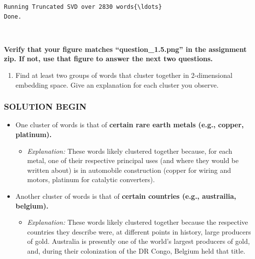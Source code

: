 \documentclass[11pt]{article}
\providecommand{\tightlist}{%
      \setlength{\itemsep}{0pt}\setlength{\parskip}{0pt}}
\begin{document}
    \begin{Verbatim}[commandchars=\\\{\}]
Running Truncated SVD over 2830 words{\ldots}
Done.
    \end{Verbatim}

    \begin{center}
    \end{center}
    { \hspace*{\fill} \\}
    
    \textbf{Verify that your figure matches ``question\_1.5.png'' in the
assignment zip. If not, use that figure to answer the next two
questions.}

    \begin{enumerate}
\def\labelenumi{\alph{enumi}.}
\tightlist
\item
  Find at least two groups of words that cluster together in
  2-dimensional embedding space. Give an explanation for each cluster
  you observe.
\end{enumerate}

    \hypertarget{solution-begin}{%
\subsubsection{SOLUTION BEGIN}\label{solution-begin}}

\begin{itemize}
\tightlist
\item
  One cluster of words is that of \textbf{certain rare earth metals
  (e.g., copper, platinum).}

  \begin{itemize}
  \tightlist
  \item
    \emph{Explanation:} These words likely clustered together because,
    for each metal, one of their respective principal uses (and where
    they would be written about) is in automobile construction (copper
    for wiring and motors, platinum for catalytic converters).
  \end{itemize}
\item
  Another cluster of words is that of \textbf{certain countries (e.g.,
  austrailia, belgium).}

  \begin{itemize}
  \tightlist
  \item
    \emph{Explanation:} These words likely clustered together because
    the respective countries they describe were, at different points in
    history, large producers of gold. Australia is presently one of the
    world's largest producers of gold, and, during their colonization of
    the DR Congo, Belgium held that title.
  \end{itemize}
\end{itemize}
\end{document}
